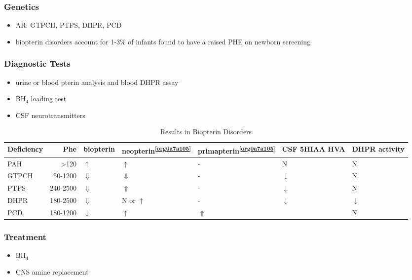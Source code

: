 \documentclass{scrartcl}
\begin{document}
\subsubsection{Genetics}
\label{sec:orgb666c76}
\begin{itemize}
\item AR: GTPCH, PTPS, DHPR, PCD
\item biopterin disorders account for 1-3\% of infants found to have a
raised PHE on newborn screening
\end{itemize}

\subsubsection{Diagnostic Tests}
\label{sec:org9dddf33}
\begin{itemize}
\item urine or blood pterin analysis and blood DHPR assay
\item BH\(_{\text{4}}\) loading test
\item CSF neurotransmitters
\end{itemize}

\begin{table}[htbp]
\caption{\label{tab:org4dd6185}
Results in Biopterin Disorders}
\centering
\begin{tabular}{lrlllll}
Deficiency & Phe & biopterin\footnotemark & neopterin\textsuperscript{\ref{org0a7a105}} & primapterin\textsuperscript{\ref{org0a7a105}} & CSF 5HIAA HVA & DHPR activity\\
\hline
PAH & \textgreater{}120 & \(\uparrow\) & \(\uparrow\) & - & N & N\\
GTPCH & 50-1200 & \(\Downarrow\) & \(\Downarrow\) & - & \(\downarrow\) & N\\
PTPS & 240-2500 & \(\Downarrow\) & \(\Uparrow\) & - & \(\downarrow\) & N\\
DHPR & 180-2500 & \(\Downarrow\) & N or \(\uparrow\) & - & \(\downarrow\) & \(\downarrow\)\\
PCD & 180-1200 & \(\downarrow\) & \(\uparrow\) & \(\Uparrow\) &  & N\\
\end{tabular}
\end{table}

\subsubsection{Treatment}
\label{sec:org2e8c6e5}
\begin{itemize}
\item BH\(_{\text{4}}\)
\item CNS amine replacement
\end{itemize}
\end{document}
